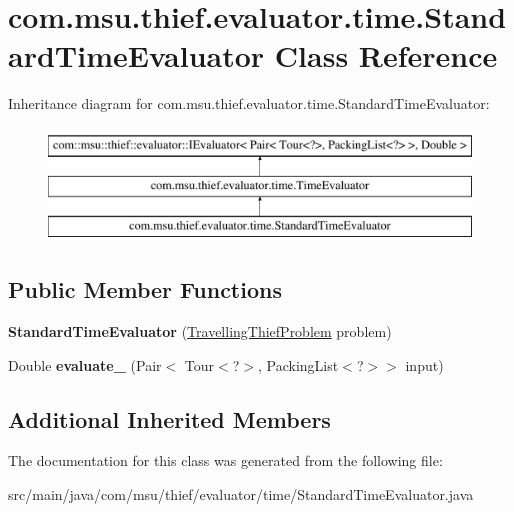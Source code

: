 \hypertarget{classcom_1_1msu_1_1thief_1_1evaluator_1_1time_1_1StandardTimeEvaluator}{\section{com.\-msu.\-thief.\-evaluator.\-time.\-Standard\-Time\-Evaluator Class Reference}
\label{classcom_1_1msu_1_1thief_1_1evaluator_1_1time_1_1StandardTimeEvaluator}
}
Inheritance diagram for com.\-msu.\-thief.\-evaluator.\-time.\-Standard\-Time\-Evaluator\-:\begin{figure}[H]
\begin{center}
\leavevmode
\includegraphics[height=3.000000cm]{classcom_1_1msu_1_1thief_1_1evaluator_1_1time_1_1StandardTimeEvaluator}
\end{center}
\end{figure}
\subsection*{Public Member Functions}
\begin{DoxyCompactItemize}
\item 
\hypertarget{classcom_1_1msu_1_1thief_1_1evaluator_1_1time_1_1StandardTimeEvaluator_ada2ccb007fd11c5e858b4227c0b3483f}{{\bfseries Standard\-Time\-Evaluator} (\hyperlink{classcom_1_1msu_1_1thief_1_1problems_1_1TravellingThiefProblem}{Travelling\-Thief\-Problem} problem)}\label{classcom_1_1msu_1_1thief_1_1evaluator_1_1time_1_1StandardTimeEvaluator_ada2ccb007fd11c5e858b4227c0b3483f}

\item 
\hypertarget{classcom_1_1msu_1_1thief_1_1evaluator_1_1time_1_1StandardTimeEvaluator_aeacf4ebaafa5b2327b7518bbb383a94f}{Double {\bfseries evaluate\-\_\-} (Pair$<$ Tour$<$?$>$, Packing\-List$<$?$>$$>$ input)}\label{classcom_1_1msu_1_1thief_1_1evaluator_1_1time_1_1StandardTimeEvaluator_aeacf4ebaafa5b2327b7518bbb383a94f}

\end{DoxyCompactItemize}
\subsection*{Additional Inherited Members}


The documentation for this class was generated from the following file\-:\begin{DoxyCompactItemize}
\item 
src/main/java/com/msu/thief/evaluator/time/Standard\-Time\-Evaluator.\-java\end{DoxyCompactItemize}
